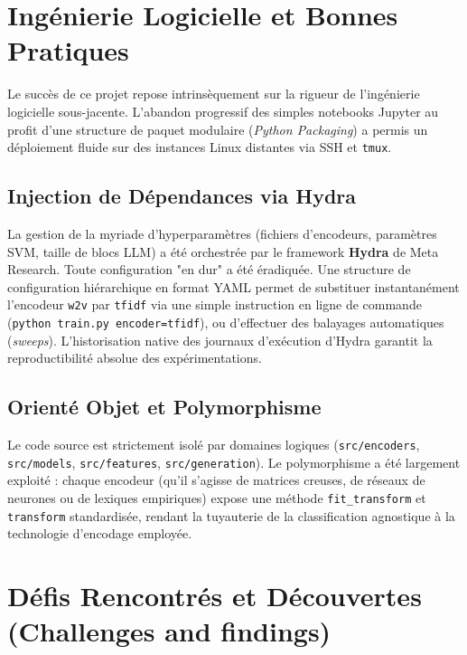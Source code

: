 \documentclass[11pt,a4paper]{article}
\begin{document}
\section{Ingénierie Logicielle et Bonnes Pratiques}

Le succès de ce projet repose intrinsèquement sur la rigueur de l'ingénierie logicielle sous-jacente. L'abandon progressif des simples notebooks Jupyter au profit d'une structure de paquet modulaire (\textit{Python Packaging}) a permis un déploiement fluide sur des instances Linux distantes via SSH et \texttt{tmux}.

\subsection{Injection de Dépendances via Hydra}
La gestion de la myriade d'hyperparamètres (fichiers d'encodeurs, paramètres SVM, taille de blocs LLM) a été orchestrée par le framework \textbf{Hydra} de Meta Research. Toute configuration "en dur" a été éradiquée. Une structure de configuration hiérarchique en format YAML permet de substituer instantanément l'encodeur \texttt{w2v} par \texttt{tfidf} via une simple instruction en ligne de commande (\texttt{python train.py encoder=tfidf}), ou d'effectuer des balayages automatiques (\textit{sweeps}). L'historisation native des journaux d'exécution d'Hydra garantit la reproductibilité absolue des expérimentations.

\subsection{Orienté Objet et Polymorphisme}
Le code source est strictement isolé par domaines logiques (\texttt{src/encoders}, \texttt{src/models}, \texttt{src/features}, \texttt{src/generation}). Le polymorphisme a été largement exploité : chaque encodeur (qu'il s'agisse de matrices creuses, de réseaux de neurones ou de lexiques empiriques) expose une méthode \texttt{fit\_transform} et \texttt{transform} standardisée, rendant la tuyauterie de la classification agnostique à la technologie d'encodage employée.


\section{Défis Rencontrés et Découvertes (Challenges and findings)}
\end{document}
